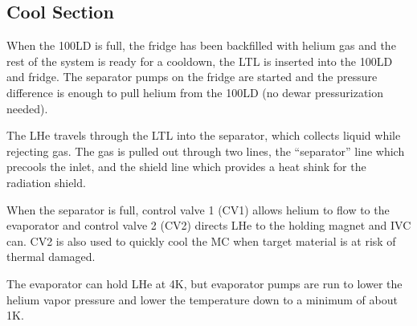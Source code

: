 \subsection{Cool \hef{} Section}

When the 100LD is full, the fridge has been backfilled with helium gas and the rest of the system is ready for a cooldown, the LTL is inserted into the 100LD and fridge.  The separator pumps on the fridge are started and the pressure difference is enough to pull helium from the 100LD (no dewar pressurization needed).

The LHe travels through the LTL into the separator, which collects liquid while rejecting gas.  The gas is pulled out through two lines, the ``separator'' line which precools the \het{} inlet, and the shield line which provides a heat shink for the radiation shield.

When the separator is full, control valve 1 (CV1) allows helium to flow to the evaporator and control valve 2 (CV2) directs LHe to the holding magnet and IVC can.  CV2 is also used to quickly cool the MC when target material is at risk of thermal damaged.

The evaporator can hold LHe at 4K, but evaporator pumps are run to lower the helium vapor pressure and lower the temperature down to a minimum of about 1K.

